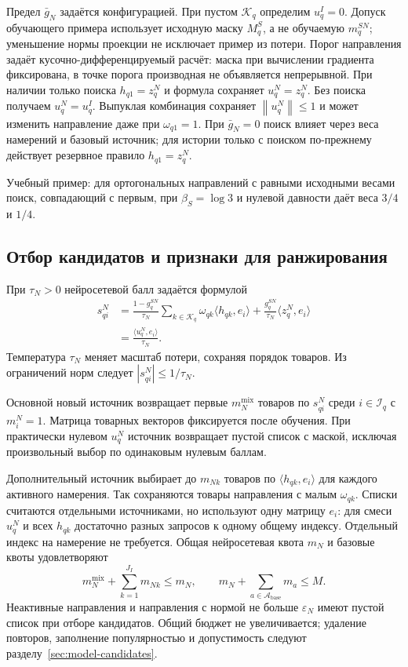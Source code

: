 \documentclass[12pt,a4paper]{article}
\newcommand{\eps}{\varepsilon}
\newcommand{\norm}[1]{\left\lVert#1\right\rVert}
\theoremstyle{plainru}
\begin{document}
Предел $\bar g_N$ задаётся конфигурацией.
При пустом $\mathcal K_q$ определим $u_q^I=0$.
Допуск обучающего примера использует исходную маску $M_q^S$, а не
обучаемую $m_q^{SN}$; уменьшение нормы проекции не исключает пример
из потери. Порог направления задаёт кусочно-дифференцируемый расчёт:
маска при вычислении градиента фиксирована, в точке порога производная
не объявляется непрерывной.
При наличии только поиска $h_{q1}=z_q^N$ и формула сохраняет
$u_q^N=z_q^N$. Без поиска получаем $u_q^N=u_q^I$.
Выпуклая комбинация сохраняет $\norm{u_q^N}\le1$ и может изменить
направление даже при $\omega_{q1}=1$. При $\bar g_N=0$ поиск влияет
через веса намерений и базовый источник; для истории только с поиском
по-прежнему действует резервное правило $h_{q1}=z_q^N$.

Учебный пример: для ортогональных направлений с равными исходными
весами поиск, совпадающий с первым, при $\beta_S=\log 3$
и нулевой давности даёт веса $3/4$ и $1/4$.

\subsection{Отбор кандидатов и признаки для ранжирования}
\label{sec:modern-retrieval}

При $\tau_N>0$ нейросетевой балл задаётся формулой
\begin{align}\label{eq:modern-score}
s_{qi}^{N}
&=\frac{1-g_q^{SN}}{\tau_N}
\sum_{k\in\mathcal K_q}\omega_{qk}\langle h_{qk},e_i\rangle
+\frac{g_q^{SN}}{\tau_N}\langle z_q^N,e_i\rangle\\
&=\frac{\langle u_q^N,e_i\rangle}{\tau_N}.
\nonumber
\end{align}
Температура $\tau_N$ меняет масштаб потери, сохраняя порядок товаров.
Из ограничений норм следует $|s_{qi}^{N}|\le1/\tau_N$.

Основной новый источник возвращает первые $m_N^{\mathrm{mix}}$ товаров
по $s_{qi}^N$ среди $i\in\mathcal I_q$ с $m_i^N=1$.
Матрица товарных векторов фиксируется после обучения.
При практически нулевом $u_q^N$ источник возвращает пустой список
с маской, исключая произвольный выбор по одинаковым нулевым баллам.

Дополнительный источник выбирает до $m_{Nk}$ товаров
по $\langle h_{qk},e_i\rangle$ для каждого активного намерения.
Так сохраняются товары направления с малым $\omega_{qk}$.
Списки считаются отдельными источниками, но используют одну матрицу
$e_i$: для смеси $u_q^N$ и всех $h_{qk}$ достаточно разных запросов
к одному общему индексу. Отдельный индекс на намерение не требуется.
Общая нейросетевая квота $m_N$ и базовые квоты удовлетворяют
\begin{equation}\label{eq:modern-quota}
m_N^{\mathrm{mix}}+\sum_{k=1}^{J_I}m_{Nk}\le m_N,\qquad
m_N+\sum_{a\in\mathcal A_{\mathrm{base}}}m_a\le M.
\end{equation}
Неактивные направления и направления с нормой не больше $\eps_N$
имеют пустой список при отборе кандидатов.
Общий бюджет не увеличивается; удаление повторов, заполнение
популярностью и допустимость следуют разделу~\ref{sec:model-candidates}.
\end{document}
